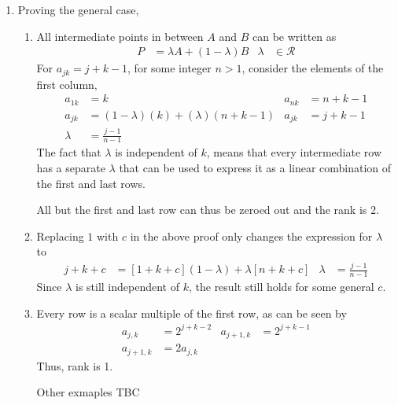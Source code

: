 \begin{enumerate}
    \item Proving the general case,
          \begin{enumerate}
              \item All intermediate points in between $ A $ and $ B $ can be written
                    as
                    \begin{align}
                        P & = \lambda A + (1 - \lambda) B & \lambda & \in \mathcal{R}
                    \end{align}
                    For $ a_{jk} = j + k - 1 $, for some integer $ n > 1 $, consider the
                    elements of the first column,
                    \begin{align}
                        a_{1k}  & = k                                   &
                        a_{nk}  & = n + k - 1                             \\
                        a_{jk}  & = (1 - \lambda)(k) + (\lambda)(n+k-1) &
                        a_{jk}  & = j+k-1                                 \\
                        \lambda & = \frac{j - 1}{n-1}
                    \end{align}
                    The fact that $ \lambda $ is independent of $ k $, means that every
                    intermediate row has a separate $ \lambda $ that can be used to
                    express it as a linear combination of the first and last rows. \par
                    All but the first and last row can thus be zeroed out and the rank
                    is 2. \par

              \item Replacing $ 1 $ with $ c $ in the above proof only changes
                    the expression for $ \lambda $ to
                    \begin{align}
                        j + k + c & = [1 + k + c](1 - \lambda) + \lambda[n+k+c] &
                        \lambda   & = \frac{j - 1}{n-1}
                    \end{align}
                    Since $ \lambda $ is still independent of $ k $, the result still
                    holds for some general $ c $.

              \item Every row is a scalar multiple of the first row, as can be seen by
                    \begin{align}
                        a_{j,k}    & = 2^{j+k-2} & a_{j+1, k} & = 2^{j+k-1} \\
                        a_{j+1, k} & = 2a_{j,k}
                    \end{align}
                    Thus, rank is 1. \par
                    Other exmaples TBC
          \end{enumerate}


\end{enumerate}
